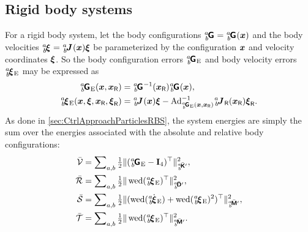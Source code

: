 \subsection{Rigid body systems}\label{sec:CtrlApproachBodyRBS}
For a rigid body system, let the body configurations $\bodyHomoCoord{\BidxI}{\BidxII} = \bodyHomoCoord{\BidxI}{\BidxII}(\sysCoord)$ and the body velocities $\bodyVel{\BidxI}{\BidxII} = \bodyJac{\BidxI}{\BidxII}(\sysCoord) \sysVel$ be parameterized by the configuration $\boldsymbol{x}$ and velocity coordinates $\boldsymbol{\xi}$.
So the body configuration errors $\bodyHomoCoordE{\BidxI}{\BidxII}$ and body velocity errors $\bodyVelE{\BidxI}{\BidxII}$ may be expressed as
\begin{subequations}
\begin{align}
 \bodyHomoCoordE{\BidxI}{\BidxII}(\sysCoord, \sysCoordR) &= \bodyHomoCoord{\BidxI}{\BidxII}^{-1}(\sysCoordR) \bodyHomoCoord{\BidxI}{\BidxII}(\sysCoord),
\\
 \bodyVelE{\BidxI}{\BidxII}(\sysCoord, \sysVel, \sysCoordR, \sysVelR) &= \bodyJac{\BidxI}{\BidxII}(\sysCoord) \sysVel - \Ad{\bodyHomoCoordE{\BidxI}{\BidxII}(\sysCoord, \sysCoordR)}^{-1} \bodyJacR{\BidxI}{\BidxII}(\sysCoordR) \sysVelR.
\end{align}
\end{subequations}
As done in \autoref{sec:CtrlApproachParticlesRBS}, the system energies are simply the sum over the energies associated with the absolute and relative body configurations:
\begin{subequations}
\begin{align}
 \potentialEnergyC &= \sum\nolimits_{\BidxI,\BidxII} \tfrac{1}{2} \norm[\bodyStiffMatCp{\BidxI}{\BidxII}]{ (\bodyHomoCoordE{\BidxI}{\BidxII} - \idMat[4] )^\top}^2,
\\
 \dissFktC &= \sum\nolimits_{\BidxI,\BidxII} \tfrac{1}{2} \norm[\bodyDissMatCp{\BidxI}{\BidxII}]{\wedOp(\bodyVelE{\BidxI}{\BidxII})^\top}^2,
\\
 \accEnergyC &= \sum\nolimits_{\BidxI,\BidxII} \tfrac{1}{2} \norm[\bodyInertiaMatCp{\BidxI}{\BidxII}]{(\wedOp(\bodyVelEd{\BidxI}{\BidxII}) + \wedOp(\bodyVelE{\BidxI}{\BidxII})^2)^\top}^2,
\\
 \kineticEnergyC &= \sum\nolimits_{\BidxI,\BidxII} \tfrac{1}{2} \norm[\bodyInertiaMatCp{\BidxI}{\BidxII}]{\wedOp(\bodyVelE{\BidxI}{\BidxII})^\top}^2.
\end{align}
\end{subequations}

